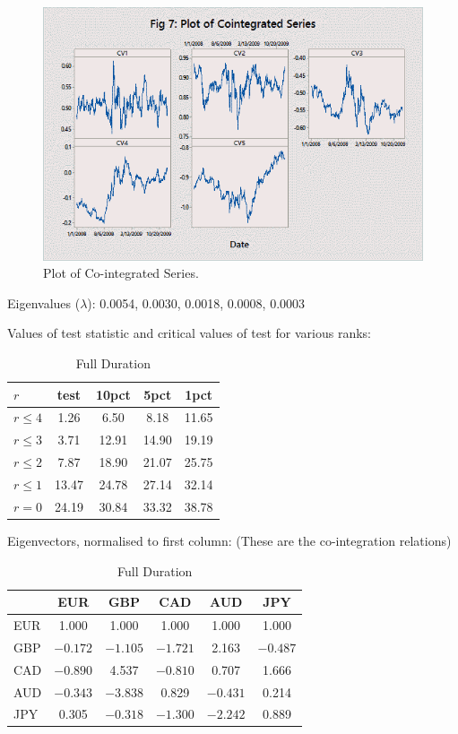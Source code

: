 	\begin{figure}[!ht]
	\centering
	\includegraphics[width=\textwidth]{chapters/chapter_mvts/figures/pcointser.png}
	\caption{Plot of Co-integrated Series. \label{fig:cointser}}
	\end{figure}
	
	\begin{table}[!ht]
	\caption{Full Duration \label{tab:fulldur}}
	\centering
	Eigenvalues ($\lambda$): 0.0054, 0.0030, 0.0018, 0.0008, 0.0003

	Values of test statistic and critical values of test for various ranks: \\[0.1cm]
	
	\begin{tabular}{| l | c | c | c | c |} \hline
	$r$  & test & 10pct & 5pct  & 1pct \\ \hline
	$r \leq 4$ &  1.26 & 6.50 & 8.18 & 11.65 \\ \hline
	$r \leq 3$ &  3.71 & 12.91 & 14.90 & 19.19\\ \hline
	$r \leq 2$ &  7.87 & 18.90 & 21.07 & 25.75\\ \hline
	$r \leq 1$ & 13.47 & 24.78 & 27.14 & 32.14\\ \hline
	$r=0$  & 24.19 & 30.84 & 33.32 & 38.78
	\end{tabular}
	
	Eigenvectors, normalised to first column: (These are the co-integration relations) \\[0.1cm]
	
	\begin{tabular}{| l | c | c | c | c | c |} \hline
	          & EUR &   GBP  &   CAD  &   AUD   &  JPY \\ \hline
	EUR & 1.000 & 1.000 & 1.000 & 1.000 & 1.000 \\ \hline
	GBP & $-0.172$ & $-1.105$ & $-1.721$ &  2.163 & $-0.487$ \\ \hline
	CAD & $-0.890$ &  4.537 & $-0.810$ &  0.707 &  1.666 \\ \hline
	AUD & $-0.343$ & $-3.838$ &  0.829 & $-0.431$ &  0.214 \\ \hline
	JPY &  0.305 & $-0.318$ & $-1.300$ & $-2.242$ & 0.889
	\end{tabular}
	\end{table}
	
